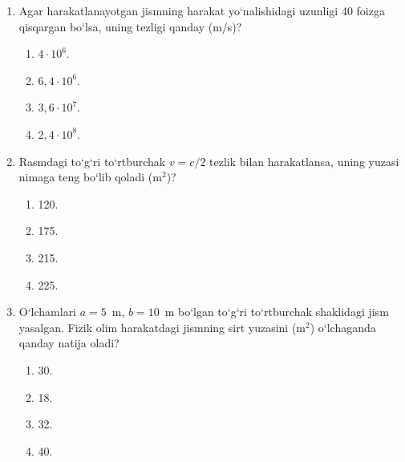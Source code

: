 \begin{enumerate}
\item Agar harakatlanayotgan jismning harakat yo‘nalishidagi uzunligi 40 foizga qisqargan bo‘lsa, uning tezligi qanday (m/s)?
\begin{enumerate}[label=\Alph*)]
\item $4\cdot 10^6$.
\item $6,4\cdot 10^6$.
\item $3,6\cdot 10^7$.
\item $2,4\cdot 10^8$.
\end{enumerate}

\item Rasmdagi to‘g‘ri to‘rtburchak $v = c/2$ tezlik bilan harakatlansa, uning yuzasi nimaga teng bo‘lib qoladi (m$^2$)?

\begin{center}
\end{center}

\begin{enumerate}[label=\Alph*)]
\item 120.
\item 175.
\item 215.
\item 225.
\end{enumerate}

\item O‘lchamlari $a = 5$~m, $b = 10$~m bo‘lgan to‘g‘ri to‘rtburchak shaklidagi jism yasalgan. Fizik olim harakatdagi jismning sirt yuzasini (m$^2$) o‘lchaganda qanday natija oladi?

\begin{center}
\end{center}

\begin{enumerate}[label=\Alph*)]
\item 30.
\item 18.
\item 32.
\item 40.
\end{enumerate}


\end{enumerate}
